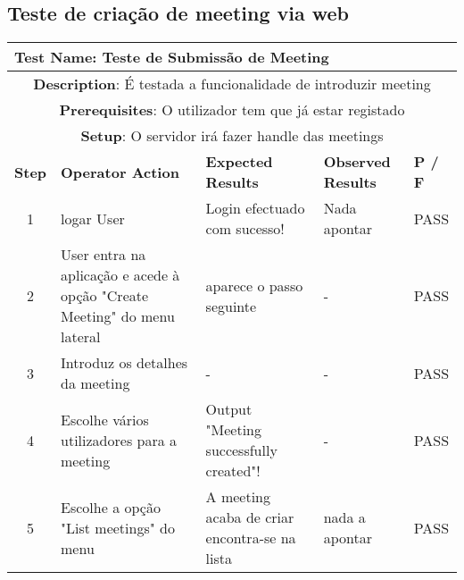 \documentclass[12pt]{article} %
\begin{document}
\subsection{Teste de criação de meeting via web}
\begin{table}[ht!]
	\begin{tabular}{|c|p{4cm}|p{4cm}|p{3cm}|p{1cm}|}
		\hline
		\multicolumn{5}{|l|}{\textbf{Test Name}: Teste de Submissão de Meeting}\\
		\hline
		\multicolumn{5}{|p{14,5cm}|}{\textbf{Description}: É testada a funcionalidade de introduzir meeting}\\
		\hline
		\multicolumn{5}{|p{14,5cm}|}{\textbf{Prerequisites}: O utilizador tem que já estar registado}\\
		\hline
		\multicolumn{5}{|p{14,5cm}|}{\textbf{Setup}: O servidor irá fazer handle das meetings}\\
		\hline
		\textbf{Step} & \textbf{Operator Action} & \textbf{Expected Results} & \textbf{Observed Results} & \textbf{P / F}\\
		\hline
		1 & logar User & Login efectuado com sucesso! & Nada apontar & PASS\\
		\hline
		2 & User entra na aplicação e acede à opção "Create Meeting" do menu lateral & aparece o passo seguinte & - & PASS\\
		\hline
		3 & Introduz os detalhes da meeting & - & - & PASS\\
		\hline
		4 & Escolhe vários utilizadores para a meeting & Output "Meeting successfully created"! & - & PASS\\
		\hline
		5 & Escolhe a opção "List meetings" do menu & A meeting acaba de criar encontra-se na lista & nada a apontar & PASS\\
		\hline
		
	\end{tabular}
\end{table}
\pagebreak


\end{document}
